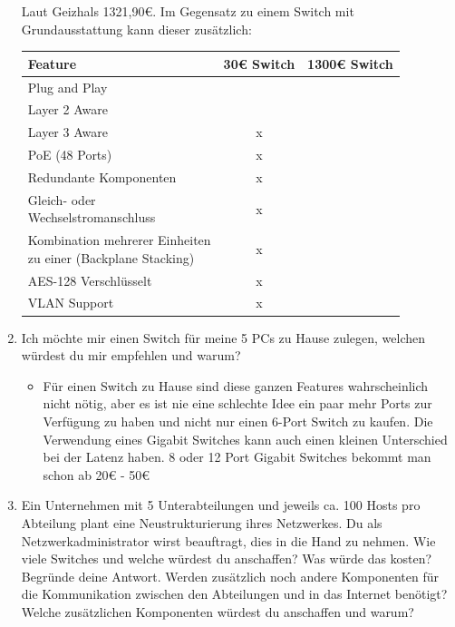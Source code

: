 \documentclass{article}
\begin{document}
\begin{enumerate}
		Laut Geizhals 1321,90€. Im Gegensatz zu einem Switch mit Grundausstattung kann dieser zusätzlich:
		\begin{center}
		\begin{tabular}{| l | c | c |}
			\toprule
			Feature 		  																																& 30€ Switch & 1300€ Switch \\ \midrule
			Plug and Play 																																& \checkmark & \checkmark 	\\ \hline
			Layer 2 Aware 																																& \checkmark & \checkmark 	\\ \hline
			Layer 3 Aware 																																& x 				 & \checkmark 	\\ \hline
			PoE (48 Ports) 																																& x 				 & \checkmark 	\\ \hline
			Redundante Komponenten 																												& x 				 & \checkmark 	\\ \hline
			\makecell[l]{Gleich- oder \\ Wechselstromanschluss} 													& x 				 & \checkmark 	\\ \hline
			\makecell[l]{Kombination mehrerer Einheiten \\ zu einer (Backplane Stacking)} & x 				 & \checkmark 	\\ \hline
			AES-128 Verschlüsselt 																												& x 				 & \checkmark 	\\ \hline
			VLAN Support 																																	& x 				 & \checkmark 	\\ \bottomrule
		\end{tabular}
		\end{center}
		\item{Ich möchte mir einen Switch für meine 5 PCs zu Hause zulegen, welchen würdest du mir empfehlen und warum?}
		\begin{itemize}
			\item{Für einen Switch zu Hause sind diese ganzen Features wahrscheinlich nicht nötig, aber es ist nie eine schlechte Idee ein paar mehr Ports zur Verfügung zu haben und nicht nur einen 6-Port Switch zu kaufen. Die Verwendung eines Gigabit Switches kann auch einen kleinen Unterschied bei der Latenz haben. 8 oder 12 Port Gigabit Switches bekommt man schon ab 20€ - 50€}
		\end{itemize}
		\item{Ein Unternehmen mit 5 Unterabteilungen und jeweils ca. 100 Hosts pro Abteilung plant eine Neustrukturierung ihres Netzwerkes. Du als Netzwerkadministrator wirst beauftragt, dies in die Hand zu nehmen. Wie viele Switches und welche würdest du anschaffen? Was würde das kosten? Begründe deine Antwort. Werden zusätzlich noch andere Komponenten für die Kommunikation zwischen den Abteilungen und in das Internet benötigt? Welche zusätzlichen Komponenten würdest du anschaffen und warum?}

\end{enumerate}
\end{document}
